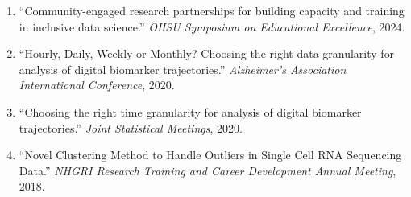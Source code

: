 
\begin{enumerate}
\item ``Community-engaged research partnerships for building capacity and training in inclusive data science.'' \textit{OHSU Symposium on Educational Excellence}, 2024.
\item ``Hourly, Daily, Weekly or Monthly? Choosing the right data granularity for analysis of digital biomarker trajectories.'' \textit{Alzheimer's Association International Conference}, 2020.
\item ``Choosing the right time granularity for analysis of digital biomarker trajectories.'' \textit{Joint Statistical Meetings}, 2020.
\item ``Novel Clustering Method to Handle Outliers in Single Cell RNA Sequencing Data.'' \textit{NHGRI Research Training and Career Development Annual Meeting}, 2018.
\end{enumerate}
